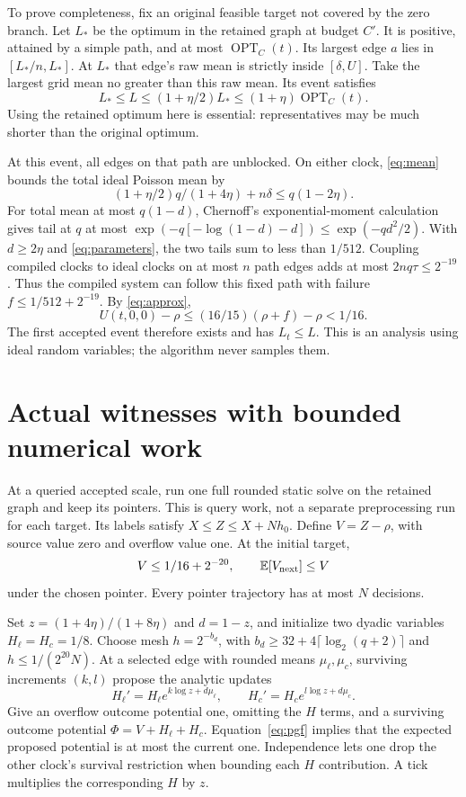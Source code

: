\documentclass[acmsmall,11pt,screen,nonacm]{acmart}
\newcommand{\OPT}{\operatorname{OPT}}
\newcommand{\E}{\mathbb{E}}
\begin{document}
To prove completeness, fix an original feasible target not covered by the zero branch. Let $L_*$ be the optimum in the retained graph at budget $C'$. It is positive, attained by a simple path, and at most $\OPT_C(t)$. Its largest edge $a$ lies in $[L_*/n,L_*]$. At $L_*$ that edge's raw mean is strictly inside $[\delta,U]$. Take the largest grid mean no greater than this raw mean. Its event satisfies
\begin{equation}\label{eq:cover}
 L_*\le L\le(1+\eta/2)L_*\le(1+\eta)\OPT_C(t).
\end{equation}
Using the retained optimum here is essential: representatives may be much shorter than the original optimum.

At this event, all edges on that path are unblocked. On either clock, \eqref{eq:mean} bounds the total ideal Poisson mean by
\[
 (1+\eta/2)q/(1+4\eta)+n\delta\le q(1-2\eta).
\]
For total mean at most $q(1-d)$, Chernoff's exponential-moment calculation gives tail at $q$ at most
$\exp(-q[-\log(1-d)-d])\le\exp(-qd^2/2)$.
With $d\ge2\eta$ and \eqref{eq:parameters}, the two tails sum to less than $1/512$. Coupling compiled clocks to ideal clocks on at most $n$ path edges adds at most $2nq\tau\le2^{-19}$. Thus the compiled system can follow this fixed path with failure $f\le1/512+2^{-19}$. By \eqref{eq:approx},
\[
 U(t,0,0)-\rho\le(16/15)(\rho+f)-\rho<1/16.
\]
The first accepted event therefore exists and has $L_t\le L$. This is an analysis using ideal random variables; the algorithm never samples them.

\section{Actual witnesses with bounded numerical work}\label{sec:witness}
At a queried accepted scale, run one full rounded static solve on the retained graph and keep its pointers. This is query work, not a separate preprocessing run for each target. Its labels satisfy $X\le Z\le X+Nh_0$. Define $V=Z-\rho$, with source value zero and overflow value one. At the initial target,
\[
 V\le1/16+2^{-20},\qquad \E[V_{\rm next}]\le V
\]
under the chosen pointer. Every pointer trajectory has at most $N$ decisions.

Set $z=(1+4\eta)/(1+8\eta)$ and $d=1-z$, and initialize two dyadic variables $H_\ell=H_c=1/8$. Choose mesh $h=2^{-b_d}$, with
$b_d\ge32+4\lceil\log_2(q+2)\rceil$ and $h\le1/(2^{20}N)$.
At a selected edge with rounded means $\mu_\ell,\mu_c$, surviving increments $(k,l)$ propose the analytic updates
\begin{equation}\label{eq:H}
 H_\ell'=H_\ell e^{k\log z+d\mu_\ell},\qquad
 H_c'=H_c e^{l\log z+d\mu_c}.
\end{equation}
Give an overflow outcome potential one, omitting the $H$ terms, and a surviving outcome potential $\Phi=V+H_\ell+H_c$. Equation~\eqref{eq:pgf} implies that the expected proposed potential is at most the current one. Independence lets one drop the other clock's survival restriction when bounding each $H$ contribution. A tick multiplies the corresponding $H$ by $z$.
\end{document}

